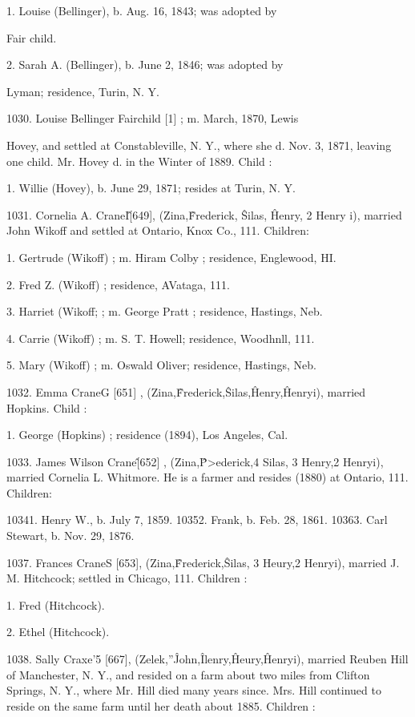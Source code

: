 \documentclass{book}
\begin{document}
1. Louise (Bellinger), b. Aug. 16, 1843; was adopted by 

Fair child. 

2. Sarah A. (Bellinger), b. June 2, 1846; was adopted by 

Lyman; residence, Turin, N. Y. 

1030. Louise Bellinger Fairchild [1] ; m. March, 1870, Lewis 

Hovey, and settled at Constableville, N. Y., where she d. 
Nov. 3, 1871, leaving one child. Mr. Hovey d. in the Winter 
of 1889. Child : 

1. Willie (Hovey), b. June 29, 1871; resides at Turin, 
N. Y. 

1031. Cornelia A. CraneI\^ [649], (Zina,\^ Frederick, \^ Silas, \^ 
Henry, 2 Henry i), married John Wikoff and settled at Ontario, 
Knox Co., 111. Children: 

1. Gertrude (Wikoff) ; m. Hiram Colby ; residence, Englewood, HI. 

2. Fred Z. (Wikoff) ; residence, AVataga, 111. 

3. Harriet (Wikoff; ; m. George Pratt ; residence, Hastings, Neb. 

4. Carrie (Wikoff) ; m. S. T. Howell; residence, Woodhnll, 111. 

5. Mary (Wikoff) ; m. Oswald Oliver; residence, Hastings, Neb. 

1032. Emma CraneG [651] , (Zina,\^ Frederick,\^ Silas,\^ Henry,\^ 
Henryi), married Hopkins. Child : 

1. George (Hopkins) ; residence (1894), Los Angeles, Cal. 

1033. James Wilson Crane\^ [652] , (Zina,\^ P>ederick,4 Silas, 3 
Henry,2 Henryi), married Cornelia L. Whitmore. He is a farmer 
and resides (1880) at Ontario, 111. Children: 

10341. Henry W., b. July 7, 1859. 
10352. Frank, b. Feb. 28, 1861. 
10363. Carl Stewart, b. Nov. 29, 1876. 




1037. Frances CraneS [653], (Zina,\^ Frederick,\^ Silas, 3 
Heury,2 Henryi), married J. M. Hitchcock; settled in Chicago, 
111. Children : 

1. Fred (Hitchcock). 

2. Ethel (Hitchcock). 

1038. Sally Craxe'5 [667], (Zelek,''\^ John,\^ Ilenry,\^ Heury,\^ 
Henryi), married Reuben Hill of Manchester, N. Y., and resided 
on a farm about two miles from Clifton Springs, N. Y., where 
Mr. Hill died many years since. Mrs. Hill continued to reside 
on the same farm until her death about 1885. Children : 
\end{document}
